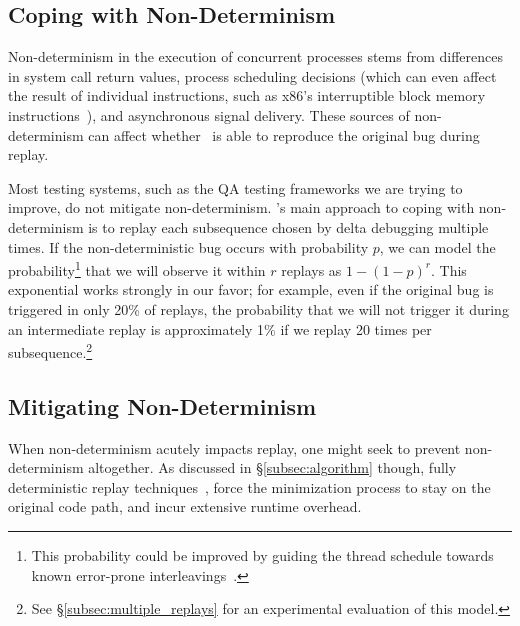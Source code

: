 \subsection{Coping with Non-Determinism}
\label{subsec:coping}

Non-determinism in the execution of concurrent processes stems from
differences in system call return values, process scheduling decisions (which can
even affect the result of individual instructions, such as x86's
interruptible block memory instructions~\cite{Dunlap:2002:REI:844128.844148}),
and asynchronous signal
delivery. These sources of non-determinism can affect whether \projectname~is
able to reproduce the original bug during replay.

Most testing systems, such as the QA testing frameworks we are
trying to improve, do not mitigate non-determinism.
\projectname's main approach to coping with non-determinism
is to replay each subsequence chosen
by delta debugging multiple times. If the non-deterministic bug occurs with
probability $p$, we can model the probability\footnote{This probability could be improved by guiding the thread schedule
towards known error-prone interleavings~\cite{park2009ctrigger,park2009pres}.}
that we will observe it within $r$ replays as $1-(1-p)^{r}$. This exponential
works strongly in our favor; for example, even if the original bug is
triggered in only 20\% of replays, the probability that we will not trigger
it during an intermediate replay is approximately
1\% if we replay 20 times per subsequence.\footnote{See
\S\ref{subsec:multiple_replays} for an experimental evaluation of this model.}

\subsection{Mitigating Non-Determinism}
\label{subsec:mitigating}

When non-determinism acutely impacts replay, one might seek to prevent non-determinism altogether.
As discussed in \S\ref{subsec:algorithm} though, fully deterministic replay techniques~\cite{Dunlap:2002:REI:844128.844148,Geels:2006:RDD:1267359.1267386},
force the minimization process to stay on the original code path, and incur
extensive runtime overhead.

